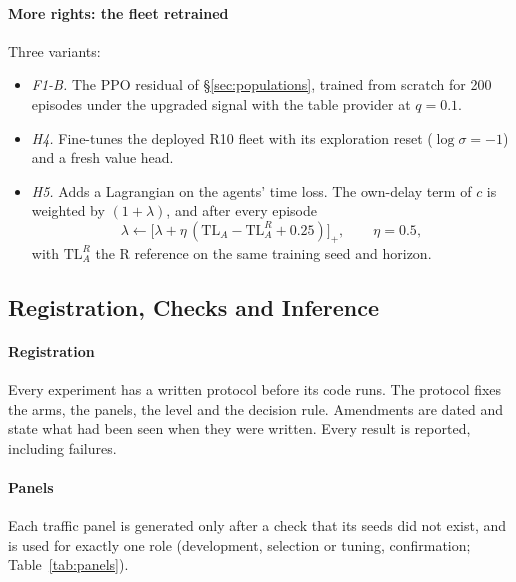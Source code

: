 \paragraph{More rights: the fleet retrained} Three variants:
\begin{itemize}\setlength\itemsep{1pt}
\item \emph{F1-B.} The PPO residual of §\ref{sec:populations}, trained from scratch for 200 episodes under the upgraded signal with the
table provider at $q=0.1$.
\item \emph{H4.} Fine-tunes the deployed R10 fleet with its exploration reset ($\log\sigma=-1$) and a fresh value head.
\item \emph{H5.} Adds a Lagrangian on the agents' time loss. The own-delay term of $c$ is weighted by $(1+\lambda)$, and after every
episode
\begin{equation}
\lambda\leftarrow\big[\lambda+\eta\,(\mathrm{TL}_A-\mathrm{TL}_A^{R}+0.25)\big]_+,\qquad \eta=0.5,
\end{equation}
with $\mathrm{TL}_A^{R}$ the R reference on the same training seed and horizon.
\end{itemize}

\subsection{Registration, Checks and Inference}\label{sec:inference}
\paragraph{Registration} Every experiment has a written protocol before its code runs. The protocol fixes the arms, the panels, the
level and the decision rule. Amendments are dated and state what had been seen when they were written. Every result is reported,
including failures.
\paragraph{Panels} Each traffic panel is generated only after a check that its seeds did not exist, and is used for exactly one role
(development, selection or tuning, confirmation; Table~\ref{tab:panels}).

